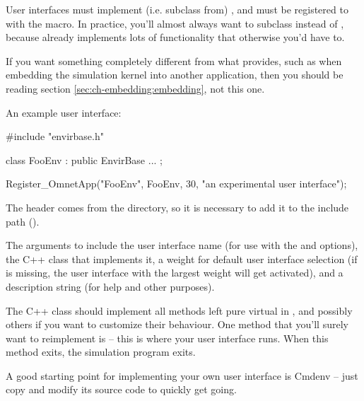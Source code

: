 User interfaces must implement (i.e. subclass from) ,
and must be registered to {\opp} with the  macro.
In practice, you'll almost always want to subclass 
instead of , because  already
implements lots of functionality that otherwise you'd have to.

\begin{note}
If you want something completely different from what 
provides, such as when embedding the simulation kernel into another
application, then you should be reading section \ref{sec:ch-embedding:embedding},
not this one.
\end{note}

An example user interface:

\begin{cpp}
#include "envirbase.h"

class FooEnv : public EnvirBase
{
    ...
};

Register_OmnetApp("FooEnv", FooEnv, 30, "an experimental user interface");
\end{cpp}

The  header comes from the  directory,
so it is necessary to add it to the include path ().

The arguments to  include the user interface name
(for use with the  and  options),
the C++ class that implements it, a weight for default user interface selection
(if  is missing, the user interface with the largest weight will get
activated), and a description string (for help and other purposes).

The C++ class should implement all methods left pure virtual in
, and possibly others if you want to customize
their behaviour. One method that you'll surely want to reimplement is
 -- this is where your user interface runs. When this method
exits, the simulation program exits.

\begin{note}
A good starting point for implementing your own user interface is
Cmdenv -- just copy and modify its source code to quickly get going.
\end{note}


